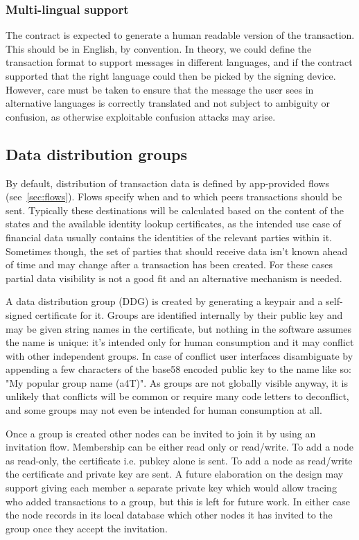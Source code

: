 \documentclass{article}
\begin{document}
\subsubsection{Multi-lingual support}

The contract is expected to generate a human readable version of the transaction. This should be in English, by
convention. In theory, we could define the transaction format to support messages in different languages, and if
the contract supported that the right language could then be picked by the signing device. However, care must be
taken to ensure that the message the user sees in alternative languages is correctly translated and not subject to
ambiguity or confusion, as otherwise exploitable confusion attacks may arise.

\subsection{Data distribution groups}

By default, distribution of transaction data is defined by app-provided flows (see~\cref{sec:flows}). Flows specify
when and to which peers transactions should be sent. Typically these destinations will be calculated based on the
content of the states and the available identity lookup certificates, as the intended use case of financial data
usually contains the identities of the relevant parties within it. Sometimes though, the set of parties that should
receive data isn't known ahead of time and may change after a transaction has been created. For these cases partial
data visibility is not a good fit and an alternative mechanism is needed.

A data distribution group (DDG) is created by generating a keypair and a self-signed certificate for it. Groups are
identified internally by their public key and may be given string names in the certificate, but nothing in the
software assumes the name is unique: it's intended only for human consumption and it may conflict with other
independent groups. In case of conflict user interfaces disambiguate by appending a few characters of the base58
encoded public key to the name like so:  "My popular group name (a4T)". As groups are not globally visible anyway,
it is unlikely that conflicts will be common or require many code letters to deconflict, and some groups may not
even be intended for human consumption at all.

Once a group is created other nodes can be invited to join it by using an invitation flow. Membership can be either
read only or read/write. To add a node as read-only, the certificate i.e. pubkey alone is sent. To add a node as
read/write the certificate and private key are sent. A future elaboration on the design may support giving each
member a separate private key which would allow tracing who added transactions to a group, but this is left for
future work. In either case the node records in its local database which other nodes it has invited to the group
once they accept the invitation.
\end{document}
